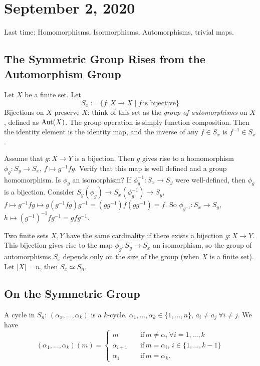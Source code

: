\section{September 2, 2020}
Last time: Homomorphisms, Isormorphisms, Automorphisms, trivial maps.
\subsection{The Symmetric Group Rises from the Automorphism Group}
\begin{example}
    Let $X$ be a finite set. Let \[
        S_x := \{ f \colon X \to X  \mid f \, \text{is bijective}\} 
    \]
    Bijections on $X$ preserve $X$: think of this set as the \emph{group of automorphisms} on $X$, defined as $\operatorname{Aut}(X)$. The group operation is simply function composition. Then the identity element is the identity map, and the inverse of any $f\in S_x$ is $f^{-1}\in S_x$.
\end{example}
Assume that $ g \colon X \to Y$ is a bijection. Then $g$ gives rise to a homomorphism $ \phi_g \colon S_y \to S_x$, $f \mapsto g^{-1}fg$. Verify that this map is well defined and a group homomorphism. Is $\phi_g$ an isomorphism? If $\phi_g^{-1} \colon S_x \to S_y$ were well-defined, then $\phi_g$ is a bijection. Consider $S_y (\phi_g) \to S_x (\phi_g^{-1}) \to S_y$, $f \mapsto g^{-1}fg \mapsto g(g^{-1}fg)g^{-1}=(gg^{-1})f(gg^{-1})=f$. So $\phi_{g^{-1}} \colon S_{x} \to S_{y}$, $h \mapsto (g^{-1})^{-1}fg^{-1}=gfg^{-1}$.

\begin{conclusion}
    Two finite sets $X,Y$ have the same cardinality if there exists a bijection $ g \colon X \to Y$. This bijection gives rise to the map $ \phi_g \colon S_y \to S_x$ an isomorphism, so the group of automorphisms $S_x$ depends only on the size of the group (when $X$ is a finite set). Let $|X|=n$, then $S_x \simeq S_n$.
\end{conclusion}

\subsection{On the Symmetric Group}
A cycle in $S_n$: $(\alpha_x , ... , \alpha_k)$ is a $k$-cycle. $\alpha_1 ,...,\alpha_k \in \{1, ...,n\} $, $a_i \neq a_j \ \forall i \neq j$. We have  
\begin{equation*}
    (\alpha_1,...,\alpha_k)(m) = 
\begin{cases}
    m \quad &\mbox{if}\, m \neq \alpha_i \ \forall i=1,...,k\\
    \alpha_{i+1} \quad &\mbox{if} \, m=\alpha_i, \, i\in \{1,...,k-1\} \\
    \alpha_1 \quad &\mbox{if} \, m=\alpha_k.

\end{cases}
\end{equation*}

